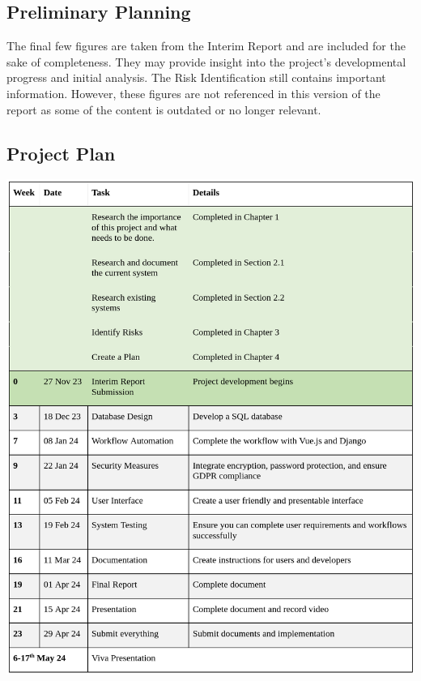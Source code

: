 \begin{appendices}
\chapter{Preliminary Planning}
The final few figures are taken from the Interim Report and are included for the sake of completeness. They may provide insight into the project's developmental progress and initial analysis. The Risk Identification still contains important information. However, these figures are not referenced in this version of the report as some of the content is outdated or no longer relevant.
\vspace{-10pt}
\section{Project Plan}
\includegraphics[width=\textwidth]{images/project-plan.png}


\end{appendices}
